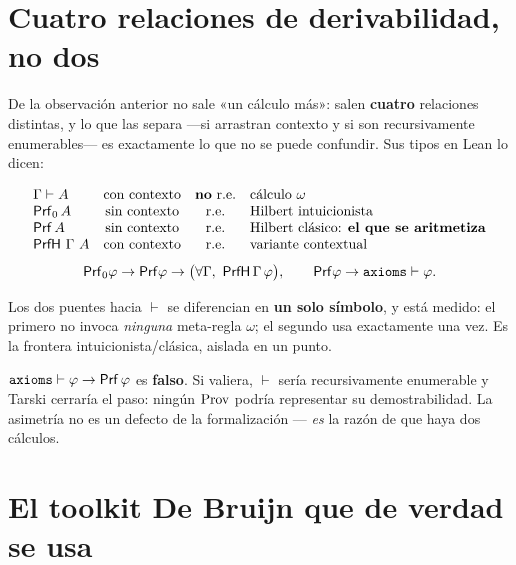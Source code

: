 \section{Cuatro relaciones de derivabilidad, no dos}

De la observación anterior no sale «un cálculo más»: salen \textbf{cuatro} relaciones distintas, y
lo que las separa —si arrastran contexto y si son recursivamente enumerables— es exactamente lo que
no se puede confundir. Sus tipos en Lean lo dicen:


\begin{matematica}
\[
\begin{array}{lccl}
\Gamma \vdash A & \text{con contexto} & \text{\textbf{no} r.e.} & \text{cálculo }\omega\\
\mathsf{Prf}_0\, A      & \text{sin contexto} & \text{r.e.} & \text{Hilbert intuicionista}\\
\mathsf{Prf}\, A        & \text{sin contexto} & \text{r.e.} & \text{Hilbert clásico: \textbf{el que se aritmetiza}}\\
\mathsf{PrfH}\ \Gamma\ A & \text{con contexto} & \text{r.e.} & \text{variante contextual}
\end{array}
\]
\[
  \Prf_0\varphi \to \Prf\varphi \to \bigl(\forall\Gamma,\ \mathsf{PrfH}\,\Gamma\,\varphi\bigr),
  \qquad \Prf\varphi \to \text{\ident{axioms}} \vdash \varphi .
\]
\end{matematica}


Los dos puentes hacia $\vdash$ se diferencian en \textbf{un solo símbolo}, y está medido: el primero
no invoca \emph{ninguna} meta-regla $\omega$; el segundo usa  exactamente una vez. Es la
frontera intuicionista/clásica, aislada en un punto.

\begin{muro}
$\text{\ident{axioms}} \vdash \varphi \to \Prf\,\varphi$ es \textbf{falso}. Si valiera, $\vdash$
sería recursivamente enumerable y Tarski cerraría el paso: ningún $\operatorname{Prov}$ podría representar su
demostrabilidad. La asimetría no es un defecto de la formalización — \emph{es} la razón de que haya
dos cálculos.
\end{muro}

\section{El toolkit De Bruijn que de verdad se usa}

